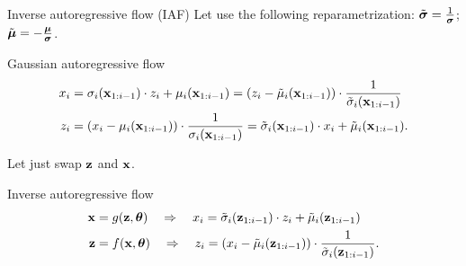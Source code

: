 \begin{frame}{Inverse autoregressive flow (IAF)}
	Let use the following reparametrization:
	$\tilde{\boldsymbol{\sigma}} = \frac{1}{\boldsymbol{\sigma}}$; $ \tilde{\boldsymbol{\mu}} = - \frac{\boldsymbol{\mu}}{\boldsymbol{\sigma}}$.
	
	\begin{block}{Gaussian autoregressive flow}
		\vspace{-0.5cm}
		\begin{align*}
			x_i &= \sigma_i (\mathbf{x}_{1:i-1}) \cdot z_i + \mu_i(\mathbf{x}_{1:i-1}) =  \left( z_i - \tilde{\mu}_i(\mathbf{x}_{1:i-1})\right) \cdot \frac{1}{\tilde{\sigma}_i (\mathbf{x}_{1:i-1}) }\\
			z_i &= \left(x_i - \mu_i(\mathbf{x}_{1:i-1}) \right) \cdot \frac{1}{ \sigma_i (\mathbf{x}_{1:i-1})} = \tilde{\sigma}_i (\mathbf{x}_{1:i-1}) \cdot x_i + \tilde{\mu}_i(\mathbf{x}_{1:i-1}).
		\end{align*}
		\vspace{-0.3cm}
	\end{block}
	Let just swap $\mathbf{z}$ and $\mathbf{x}$. 
	
	\begin{block}{Inverse autoregressive flow}
		\vspace{-0.5cm}
		\begin{align*}
			\mathbf{x} &= g(\mathbf{z}, \boldsymbol{\theta}) \quad \Rightarrow \quad x_i = \tilde{\sigma}_i (\mathbf{z}_{1:i-1}) \cdot z_i + \tilde{\mu}_i(\mathbf{z}_{1:i-1}) \\
			\mathbf{z} &= f(\mathbf{x}, \boldsymbol{\theta}) \quad \Rightarrow \quad z_i = \left( x_i - \tilde{\mu}_i(\mathbf{z}_{1:i-1})\right) \cdot \frac{1}{\tilde{\sigma}_i (\mathbf{z}_{1:i-1}) }.
		\end{align*}
		\vspace{-0.3cm}
	\end{block}
	
\end{frame}
